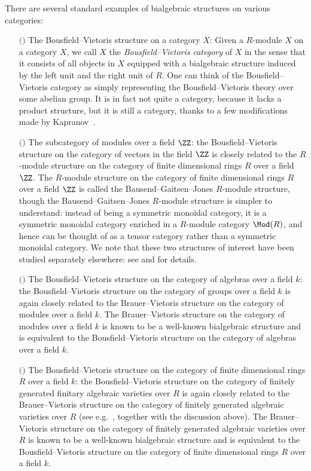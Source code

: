 \documentclass[a4paper,reqno,oneside]{article}
\begin{document}
There are several standard examples of bialgebraic structures on various categories: 
\begin{itemize}
    \item[$($\bullet$)$] The Bousfield--Vietoris structure on a category $X$:  Given a $R$-module $X$ on a category $X$, we call $X$ the {\it Bousfield--Vietoris category} of $X$ in the sense that it consists of all objects in $X$ equipped with a bialgebraic structure induced by the left unit and the right unit of $R$. One can think of the Bousfield--Vietoris category as simply representing the Bousfield--Vietoris theory over some abelian group. It is in fact not quite a category, because it lacks a product structure, but it is still a category, thanks to a few modifications made by Kapranov~\cite{kapranov}. 
    \item[$($\bullet$)$] The subcategory of modules over a field $\ZZ$: the Bousfield--Vietoris structure on the category of vectors in the field $\ZZ$ is closely related to the $R$-module structure on the category of finite dimensional rings $R$ over a field $\ZZ$. The $R$-module structure on the category of finite dimensional rings $R$ over a field $\ZZ$ is called the Bausend--Gaitsen--Jones $R$-module structure, though the Bausend--Gaitsen--Jones $R$-module structure is simpler to understand: instead of being a symmetric monoidal category, it is a symmetric monoidal category enriched in a $R$-module category $\Mod(R)$, and hence can be thought of as a tensor category rather than a symmetric monoidal category. We note that these two structures of interest have been studied separately elsewhere: see \cite{bakery1976tensor} and \cite{brinco1973cohomology} for details.
    \item[$($\bullet$)$] The Bousfield--Vietoris structure on the category of algebras over a field $k$: the Bousfield--Vietoris structure on the category of groups over a field $k$ is again closely related to the Brauer--Vietoris structure on the category of modules over a field $k$. The Brauer--Vietoris structure on the category of modules over a field $k$ is known to be a well-known bialgebraic structure and is equivalent to the Bousfield--Vietoris structure on the category of algebras over a field $k$. 
    \item[$($\bullet$)$] The Bousfield--Vietoris structure on the category of finite dimensional rings $R$ over a field $k$: the Bousfield--Vietoris structure on the category of finitely generated finitary algebraic varieties over $R$ is again closely related to the Brauer--Vietoris structure on the category of finitely generated algebraic varieties over $R$ (see e.g.~\cite{cockett1984finitely,cockett1988finite,rouget2013cohomological,rouget2020charac}, together with the discussion above). The Brauer--Vietoris structure on the category of finitely generated algebraic varieties over $R$ is known to be a well-known bialgebraic structure and is equivalent to the Bousfield--Vietoris structure on the category of finite dimensional rings $R$ over a field $k$. 
\end{itemize}
\end{document}

